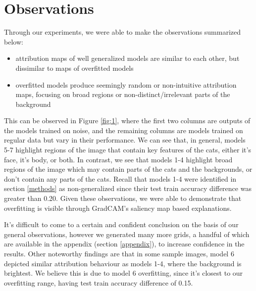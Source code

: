 \documentclass[conference]{IEEEtran}
\begin{document}

\section{Observations}
Through our experiments, we were able to make the observations summarized below: 
\begin{itemize}
  \item attribution maps of well generalized models are similar to each other, but dissimilar to maps of overfitted models 
  \item overfitted models produce seemingly random or non-intuitive attribution maps, focusing on broad regions or non-distinct/irrelevant parts of the background 
\end{itemize}
This can be observed in Figure \ref{fig:1}, where the first two columns are outputs of the models trained on noise, and the remaining columns are models trained on regular data but vary in their performance. We can see that, in general, models 5-7 highlight regions of the image that contain key features of the cats, either it's face, it's body, or both. In contrast, we see that models 1-4 highlight broad regions of the image which may contain parts of the cats and the backgrounds, or don't contain any parts of the cats. Recall that models 1-4 were identified in section \ref{methods} as non-generalized since their test train accuracy difference was greater than 0.20. Given these observations, we were able to demonstrate that overfitting is visible through GradCAM's saliency map based explanations. 

It's difficult to come to a certain and confident conclusion on the basis of our general observations, however we generated many more grids, a handful of which are available in the appendix (section \ref{appendix}), to increase confidence in the results. 
Other noteworthy findings are that in some sample images,  model 6 depicted similar attribution behaviour as models 1-4, where the background is brightest. We believe this is due to model 6 overfitting, since it's closest to our overfitting range, having test train accuracy difference of 0.15. 
\end{document}
